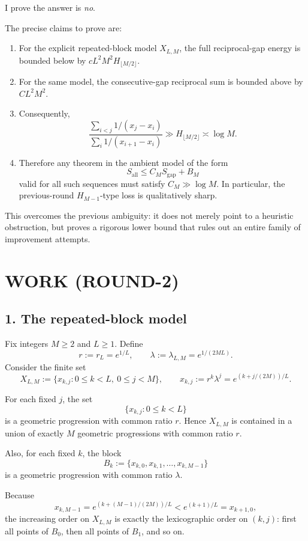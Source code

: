 I prove the answer is \emph{no}.

The precise claims to prove are:

\begin{enumerate}
\item For the explicit repeated-block model \(X_{L,M}\), the full reciprocal-gap energy is bounded below by \(cL^2M^2H_{\lfloor M/2\rfloor}\).
\item For the same model, the consecutive-gap reciprocal sum is bounded above by \(CL^2M^2\).
\item Consequently,
\[
\frac{\sum_{i<j}1/(x_j-x_i)}{\sum_i 1/(x_{i+1}-x_i)}\gg H_{\lfloor M/2\rfloor}\asymp \log M.
\]
\item Therefore any theorem in the ambient model of the form
\[
S_{\mathrm{all}}\le C_M S_{\mathrm{gap}}+B_M
\]
valid for all such sequences must satisfy \(C_M\gg \log M\). In particular, the previous-round \(H_{M-1}\)-type loss is qualitatively sharp.
\end{enumerate}

This overcomes the previous ambiguity: it does not merely point to a heuristic obstruction, but proves a rigorous lower bound that rules out an entire family of improvement attempts.

\section{WORK (ROUND-2)}

\subsection*{1. The repeated-block model}

Fix integers \(M\ge 2\) and \(L\ge 1\). Define
\[
r:=r_L=e^{1/L},
\qquad
\lambda:=\lambda_{L,M}=e^{1/(2ML)}.
\]
Consider the finite set
\[
X_{L,M}:=\{x_{k,j}: 0\le k<L,\ 0\le j<M\},
\qquad
x_{k,j}:=r^k\lambda^j=e^{(k+j/(2M))/L}.
\]

For each fixed \(j\), the set
\[
\{x_{k,j}:0\le k<L\}
\]
is a geometric progression with common ratio \(r\). Hence \(X_{L,M}\) is contained in a union of exactly \(M\) geometric progressions with common ratio \(r\).

Also, for each fixed \(k\), the block
\[
B_k:=\{x_{k,0},x_{k,1},\dots,x_{k,M-1}\}
\]
is a geometric progression with common ratio \(\lambda\).

Because
\[
x_{k,M-1}=e^{(k+(M-1)/(2M))/L}<e^{(k+1)/L}=x_{k+1,0},
\]
the increasing order on \(X_{L,M}\) is exactly the lexicographic order on \((k,j)\): first all points of \(B_0\), then all points of \(B_1\), and so on.

